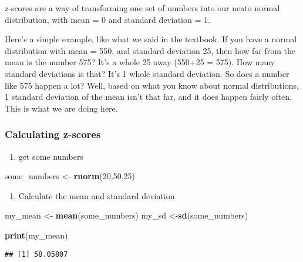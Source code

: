 \documentclass[
]{book}
\newenvironment{Shaded}{\begin{snugshade}}{\end{snugshade}}
\newcommand{\DecValTok}[1]{\textcolor[rgb]{0.00,0.00,0.81}{#1}}
\newcommand{\FunctionTok}[1]{\textcolor[rgb]{0.13,0.29,0.53}{\textbf{#1}}}
\newcommand{\NormalTok}[1]{#1}
\newcommand{\OtherTok}[1]{\textcolor[rgb]{0.56,0.35,0.01}{#1}}
\providecommand{\tightlist}{%
  \setlength{\itemsep}{0pt}\setlength{\parskip}{0pt}}
\begin{document}
z-scores are a way of transforming one set of numbers into our neato
normal distribution, with mean = 0 and standard deviation = 1.

Here's a simple example, like what we said in the textbook. If you have
a normal distribution with mean = 550, and standard deviation 25, then
how far from the mean is the number 575? It's a whole 25 away (550+25 =
575). How many standard deviations is that? It's 1 whole standard
deviation. So does a number like 575 happen a lot? Well, based on what
you know about normal distributions, 1 standard deviation of the mean
isn't that far, and it does happen fairly often. This is what we are
doing here.

\hypertarget{calculating-z-scores}{%
\subsubsection{Calculating z-scores}\label{calculating-z-scores}}

\begin{enumerate}
\def\labelenumi{\arabic{enumi}.}
\tightlist
\item
  get some numbers
\end{enumerate}

\begin{Shaded}
\begin{Highlighting}[]
\NormalTok{some\_numbers }\OtherTok{\textless{}{-}} \FunctionTok{rnorm}\NormalTok{(}\DecValTok{20}\NormalTok{,}\DecValTok{50}\NormalTok{,}\DecValTok{25}\NormalTok{)}
\end{Highlighting}
\end{Shaded}

\begin{enumerate}
\def\labelenumi{\arabic{enumi}.}
\setcounter{enumi}{1}
\tightlist
\item
  Calculate the mean and standard deviation
\end{enumerate}

\begin{Shaded}
\begin{Highlighting}[]
\NormalTok{my\_mean }\OtherTok{\textless{}{-}} \FunctionTok{mean}\NormalTok{(some\_numbers)}
\NormalTok{my\_sd }\OtherTok{\textless{}{-}}\FunctionTok{sd}\NormalTok{(some\_numbers)}

\FunctionTok{print}\NormalTok{(my\_mean)}
\end{Highlighting}
\end{Shaded}

\begin{verbatim}
## [1] 58.05807
\end{verbatim}
\end{document}
